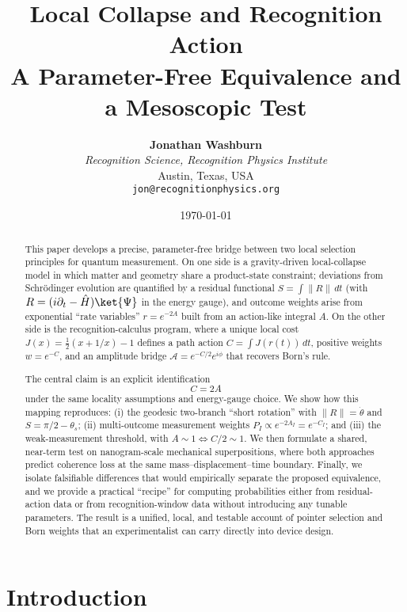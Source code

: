 \documentclass[11pt,letterpaper]{article}
\title{
  \vspace{-1cm}
  {\Huge\bfseries\color{maincolor} Local Collapse and Recognition Action}\\[0.5em]
  {\Large A Parameter-Free Equivalence and a Mesoscopic Test}
}
\author{
  \textbf{Jonathan Washburn}\\[0.3em]
  \textit{Recognition Science, Recognition Physics Institute}\\
  Austin, Texas, USA\\[0.2em]
  \texttt{jon@recognitionphysics.org}
}
\date{\today}
\theoremstyle{definition}
\begin{document}
\maketitle


\begin{abstract}
\noindent
This paper develops a precise, parameter-free bridge between two local selection principles for quantum measurement. On one side is a gravity-driven local-collapse model in which matter and geometry share a product-state constraint; deviations from Schrödinger evolution are quantified by a residual functional $S=\int\|R\|\,dt$ (with $R=(i\partial_t-\hat H)\ket{\Psi}$ in the energy gauge), and outcome weights arise from exponential ``rate variables'' $r=e^{-2A}$ built from an action-like integral $A$. On the other side is the recognition-calculus program, where a unique local cost $J(x)=\frac{1}{2}(x+1/x)-1$ defines a path action $C=\int J(r(t))\,dt$, positive weights $w=e^{-C}$, and an amplitude bridge $\mathcal{A}=e^{-C/2}e^{i\phi}$ that recovers Born's rule.

The central claim is an explicit identification
\begin{equation}
\boxed{\quad C = 2A \quad}
\end{equation}
under the same locality assumptions and energy-gauge choice. We show how this mapping reproduces: (i) the geodesic two-branch ``short rotation'' with $\|R\|=\dot{\theta}$ and $S=\pi/2-\theta_s$; (ii) multi-outcome measurement weights $P_I \propto e^{-2A_I}=e^{-C_I}$; and (iii) the weak-measurement threshold, with $A\sim 1 \Longleftrightarrow C/2\sim 1$. We then formulate a shared, near-term test on nanogram-scale mechanical superpositions, where both approaches predict coherence loss at the same mass--displacement--time boundary. Finally, we isolate falsifiable differences that would empirically separate the proposed equivalence, and we provide a practical ``recipe'' for computing probabilities either from residual-action data or from recognition-window data without introducing any tunable parameters. The result is a unified, local, and testable account of pointer selection and Born weights that an experimentalist can carry directly into device design.
\end{abstract}

\section{Introduction}
\end{document}
